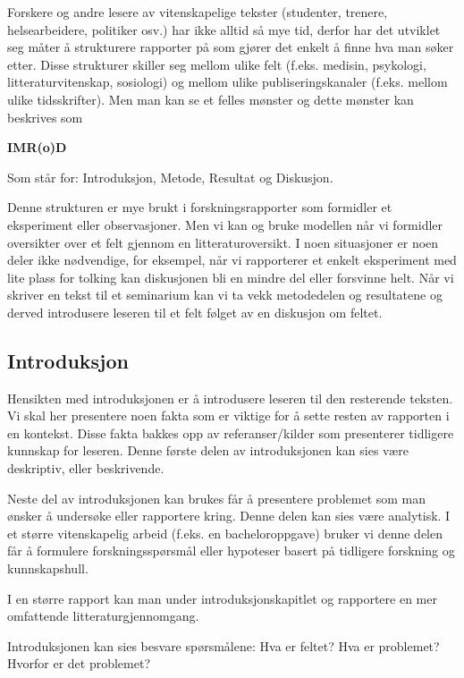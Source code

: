 \documentclass[
  letterpaper,
  DIV=11,
  numbers=noendperiod,
  oneside]{scrreprt}
\begin{document}
Forskere og andre lesere av vitenskapelige tekster (studenter, trenere,
helsearbeidere, politiker osv.) har ikke alltid så mye tid, derfor har
det utviklet seg måter å strukturere rapporter på som gjører det enkelt
å finne hva man søker etter. Disse strukturer skiller seg mellom ulike
felt (f.eks. medisin, psykologi, litteraturvitenskap, sosiologi) og
mellom ulike publiseringskanaler (f.eks. mellom ulike tidsskrifter). Men
man kan se et felles mønster og dette mønster kan beskrives som

\textbf{IMR(o)D}

Som står for: Introduksjon, Metode, Resultat og Diskusjon.

Denne strukturen er mye brukt i forskningsrapporter som formidler et
eksperiment eller observasjoner. Men vi kan og bruke modellen når vi
formidler oversikter over et felt gjennom en litteraturoversikt. I noen
situasjoner er noen deler ikke nødvendige, for eksempel, når vi
rapporterer et enkelt eksperiment med lite plass for tolking kan
diskusjonen bli en mindre del eller forsvinne helt. Når vi skriver en
tekst til et seminarium kan vi ta vekk metodedelen og resultatene og
derved introdusere leseren til et felt følget av en diskusjon om feltet.

\hypertarget{introduksjon}{%
\subsection{Introduksjon}\label{introduksjon}}

Hensikten med introduksjonen er å introdusere leseren til den resterende
teksten. Vi skal her presentere noen fakta som er viktige for å sette
resten av rapporten i en kontekst. Disse fakta bakkes opp av
referanser/kilder som presenterer tidligere kunnskap for leseren. Denne
første delen av introduksjonen kan sies være deskriptiv, eller
beskrivende.

Neste del av introduksjonen kan brukes får å presentere problemet som
man ønsker å undersøke eller rapportere kring. Denne delen kan sies være
analytisk. I et større vitenskapelig arbeid (f.eks. en bacheloroppgave)
bruker vi denne delen får å formulere forskningsspørsmål eller hypoteser
basert på tidligere forskning og kunnskapshull.

I en større rapport kan man under introduksjonskapitlet og rapportere en
mer omfattende litteraturgjennomgang.

Introduksjonen kan sies besvare spørsmålene: Hva er feltet? Hva er
problemet? Hvorfor er det problemet?
\end{document}
